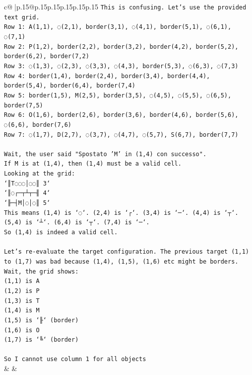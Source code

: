 \documentclass{article}
\begin{document}
{\begin{supertabular}{c@{$\;$}|p{.15\linewidth}@{}p{.15\linewidth}p{.15\linewidth}p{.15\linewidth}p{.15\linewidth}p{.15\linewidth}}
{{{\texttt{This is confusing. Let's use the provided text grid.} \\
\texttt{Row 1: A(1,1), ◌(2,1), border(3,1), ◌(4,1), border(5,1), ◌(6,1), ◌(7,1)} \\
\texttt{Row 2: P(1,2), border(2,2), border(3,2), border(4,2), border(5,2), border(6,2), border(7,2)} \\
\texttt{Row 3: ◌(1,3), ◌(2,3), ◌(3,3), ◌(4,3), border(5,3), ◌(6,3), ◌(7,3)} \\
\texttt{Row 4: border(1,4), border(2,4), border(3,4), border(4,4), border(5,4), border(6,4), border(7,4)} \\
\texttt{Row 5: border(1,5), M(2,5), border(3,5), ◌(4,5), ◌(5,5), ◌(6,5), border(7,5)} \\
\texttt{Row 6: O(1,6), border(2,6), border(3,6), border(4,6), border(5,6), ◌(6,6), border(7,6)} \\
\texttt{Row 7: ◌(1,7), D(2,7), ◌(3,7), ◌(4,7), ◌(5,7), S(6,7), border(7,7)} \\
\\ 
\texttt{Wait, the user said "Spostato 'M' in (1,4) con successo".} \\
\texttt{If M is at (1,4), then (1,4) must be a valid cell.} \\
\texttt{Looking at the grid:} \\
\texttt{`║T◌◌◌│◌◌║ 3`} \\
\texttt{`║◌┌─┬┴┬─╢ 4`} \\
\texttt{`╟─┤M│◌│◌║ 5`} \\
\texttt{This means (1,4) is `◌`. (2,4) is `┌`. (3,4) is `─`. (4,4) is `┬`. (5,4) is `┴`. (6,4) is `┬`. (7,4) is `─`.} \\
\texttt{So (1,4) is indeed a valid cell.} \\
\\ 
\texttt{Let's re{-}evaluate the target configuration. The previous target (1,1) to (1,7) was bad because (1,4), (1,5), (1,6) etc might be borders.} \\
\texttt{Wait, the grid shows:} \\
\texttt{(1,1) is A} \\
\texttt{(1,2) is P} \\
\texttt{(1,3) is T} \\
\texttt{(1,4) is M} \\
\texttt{(1,5) is `╟` (border)} \\
\texttt{(1,6) is O} \\
\texttt{(1,7) is `╚` (border)} \\
\\ 
\texttt{So I cannot use column 1 for all objects} \\
            }
        }
    }
    & & \\ \\


\end{supertabular}}
\end{document}
